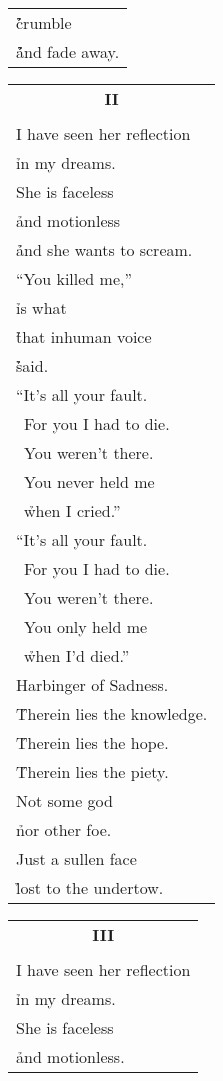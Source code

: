 \documentclass{article}
\begin{document}
\begin{center}
\begin{tabular}{l}
\h\h\h\h crumble \\
\h\h\h\h\h and fade away. \\
\end{tabular}
\begin{tabular}{l}
\multicolumn{1}{c}{\large\textbf{II}} \\
\\
I have seen her reflection \\
\h in my dreams. \\
She is faceless \\
\h and motionless \\
\h\h and she wants to scream. \\ %
``You killed me,'' \\
\h is what \\
\h\h that inhuman voice \\
\h\h\h said. \\
``It's all your fault. \\
\ For you I had to die. \\
\ You weren't there. \\
\ You never held me \\
\ \h when I cried.'' \\
``It's all your fault. \\
\ For you I had to die. \\
\ You weren't there. \\
\ You only held me \\
\ \h when I'd died.'' \\
Harbinger of Sadness. \\
\h Therein lies the knowledge. \\
\h Therein lies the hope. \\
\h Therein lies the piety. \\
Not some god \\
\h nor other foe. \\ %
Just a sullen face \\
\h lost to the undertow. \\
\end{tabular}
\begin{tabular}{l}
\multicolumn{1}{c}{\large\textbf{III}} \\
\\
I have seen her reflection \\
\h in my dreams. \\
She is faceless \\
\h and motionless. \\

\end{tabular}
\end{center}
\end{document}
